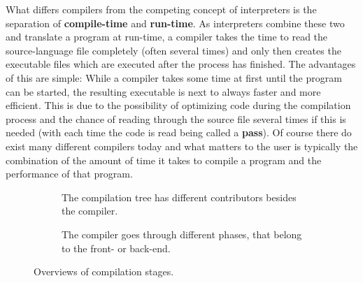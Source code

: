 What differs compilers from the competing concept of interpreters is the separation of \textbf{compile-time} and \textbf{run-time}.
As interpreters combine these two and translate a program at run-time, a compiler takes the time to read the source-language file completely (often several times) and only then creates the executable files which are executed after the process has finished.
The advantages of this are simple:
While a compiler takes some time at first until the program can be started, the resulting executable is next to always faster and more efficient.
This is due to the possibility of optimizing code during the compilation process and the chance of reading through the source file several times if this is needed (with each time the code is read being called a \textbf{pass}).
Of course there do exist many different compilers today and what matters to the user is typically the combination of the amount of time it takes to compile a program and the performance of that program.
\begin{figure}[htb]
    \centering
    \begin{subfigure}[t]{0.25\textwidth}
        
        \caption{\label{fig:cmpstruct} The compilation tree has different contributors besides the compiler.}
    \end{subfigure} \hspace{2cm}
    \begin{subfigure}[t]{0.37\textwidth}
        
        \caption{\label{fig:cmpintstruct} The compiler goes through different phases, that belong to the front- or back-end.}
    \end{subfigure}
    \caption{\label{fig:cmp} Overviews of compilation stages.}
\end{figure}

